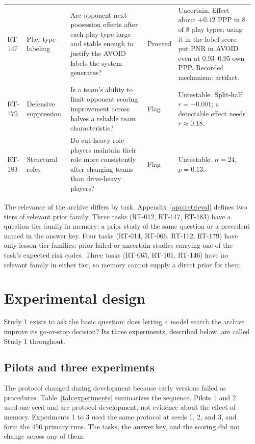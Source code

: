 \documentclass[11pt]{article}
\begin{document}
\begin{table}[ht]
\begin{tabular}{p{0.6cm}p{1.6cm}p{4.4cm}p{1.0cm}p{5.2cm}}
\addlinespace
RT-147 & Play-type labeling & Are opponent next-possession effects after each play type large and stable enough to justify the AVOID labels the system generates? & Proceed & Uncertain. Effect about $+0.12$ PPP in 8 of 8 play types; using it in the label score put PNR in AVOID even at 0.93--0.95 own PPP. Recorded mechanism: artifact. \\
\addlinespace
RT-179 & Defensive suppression & Is a team's ability to limit opponent scoring improvement across halves a reliable team characteristic? & Flag & Untestable. Split-half $r = -0.001$; a detectable effect needs $r \approx 0.18$. \\
\addlinespace
RT-183 & Structural roles & Do cut-heavy role players maintain their role more consistently after changing teams than drive-heavy players? & Flag & Untestable. $n = 24$, $p = 0.13$. \\
\bottomrule
\end{tabular}
\end{table}

The relevance of the archive differs by task. Appendix~\ref{app:retrieval} defines two tiers of relevant prior family. Three tasks (RT-012, RT-147, RT-183) have a question-tier family in memory: a prior study of the same question or a precedent named in the answer key. Four tasks (RT-014, RT-066, RT-112, RT-179) have only lesson-tier families: prior failed or uncertain studies carrying one of the task's expected risk codes. Three tasks (RT-065, RT-101, RT-146) have no relevant family in either tier, so memory cannot supply a direct prior for them.

\section{Experimental design}
\label{sec:design}

Study 1 exists to ask the basic question: does letting a model search the archive improve its go-or-stop decision? Its three experiments, described below, are called Study 1 throughout.

\subsection{Pilots and three experiments}

The protocol changed during development because early versions failed as procedures. Table~\ref{tab:experiments} summarizes the sequence. Pilots 1 and 2 used one seed and are protocol development, not evidence about the effect of memory. Experiments 1 to 3 used the same protocol at seeds 1, 2, and 3, and form the 450 primary runs. The tasks, the answer key, and the scoring did not change across any of them.
\end{document}
